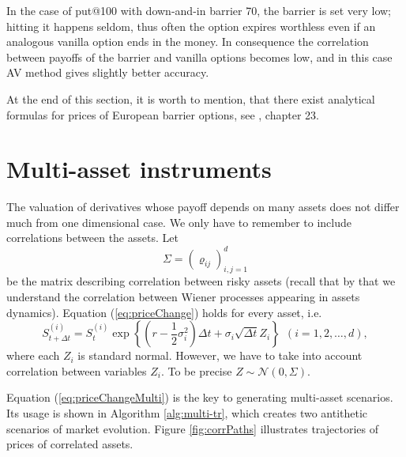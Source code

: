 \documentclass[a4paper,11pt, twoside]{book}
\theoremstyle{definition}
\theoremstyle{remark}
\begin{document}
In the case of put@100 with down-and-in barrier 70, the barrier is set very low; hitting it happens seldom, thus often the option expires worthless even if an analogous vanilla option ends in the money. In consequence the correlation between payoffs of the barrier and vanilla options becomes low, and in this case AV method gives slightly better accuracy. 

At the end of this section, it is worth to mention, that there exist analytical formulas for prices of European barrier options, see \cite{wilmott}, chapter 23.

\section{Multi-asset instruments}
\label{sec:multi-asset}
The valuation of derivatives whose payoff depends on many assets does not differ much from one dimensional case. We only have to remember to include correlations between the assets. Let
\[ \Sigma = \left( \varrho_{ij} \right)_{i,j=1}^d \]
be the matrix describing correlation between risky assets (recall that by that we understand the correlation between Wiener processes appearing in assets dynamics). Equation (\ref{eq:priceChange}) holds for every asset, i.e.
\begin{equation}
 \label{eq:priceChangeMulti}
  S^{(i)}_{t + {\Delta} t} = S^{(i)}_t \exp\left\{ (r - \frac{1}{2}\sigma_i^2)\Delta t + \sigma_i \sqrt{\Delta t} Z_i \right\}\ \ (i = 1,2,\ldots,d),
\end{equation}
where each $Z_i$ is standard normal. However, we have to take into account correlation between variables $Z_i$. To be precise $Z \sim \mathcal{N}(0, \Sigma)$.

Equation (\ref{eq:priceChangeMulti}) is the key to generating multi-asset scenarios. Its usage is shown in Algorithm \ref{alg:multi-tr}, which creates two antithetic scenarios of market evolution. Figure \ref{fig:corrPaths} illustrates trajectories of prices of correlated assets.
\end{document}
